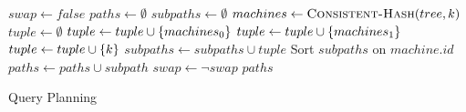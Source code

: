 \begin{algorithm}
    \begin{algorithmic}
            \State $swap \gets false$
            \State $paths \gets \emptyset$
                \State $subpaths \gets \emptyset$
                    \State $machines \gets \Call{Consistent-Hash}{tree, k}$
                    \State $tuple \gets \emptyset$
                        \State $tuple \gets tuple \cup \left\{machines_0\right\}$
                    \Else
                        \State $tuple \gets tuple \cup \left\{machines_1\right\}$
                    \EndIf
                    \State $tuple \gets tuple \cup \left\{k\right\}$
                    \State $subpaths \gets subpaths \cup tuple$
                \EndFor
                \State Sort $subpaths$ on $machine.id$
                \State $paths \gets paths \cup subpath$
                \State $swap \gets \neg swap$
            \EndFor
            \Return $paths$
        \EndProcedure
    \end{algorithmic}
    \caption{Query Planning}
    \label{alg:query-planning}
\end{algorithm}
%
